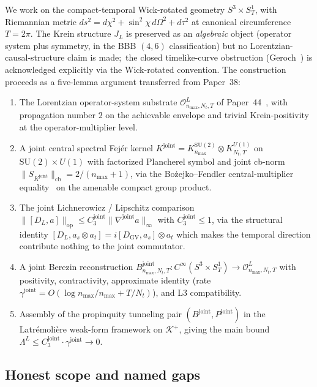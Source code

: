 \documentclass[11pt,a4paper]{article}
\theoremstyle{plain}
\theoremstyle{definition}
\newcommand{\nmax}{n_{\max}}
\newcommand{\Nt}{N_{t}}
\newcommand{\Manifold}{S^{3}\times S^{1}_{T}}
\newcommand{\Krein}{\mathcal{K}}
\newcommand{\Op}{\mathcal{O}}
\newcommand{\opnorm}[1]{\lVert #1 \rVert_{\mathrm{op}}}
\newcommand{\cbnorm}[1]{\lVert #1 \rVert_{\mathrm{cb}}}
\newcommand{\norm}[1]{\lVert #1 \rVert}
\newcommand{\SU}{\mathrm{SU}}
\newcommand{\Uone}{U(1)}
\newcommand{\DGV}{D_{\mathrm{GV}}}
\newcommand{\DL}{D_{L}}
\newcommand{\JL}{J_{L}}
\newcommand{\Lprop}{\Lambda^{L}}
\newcommand{\Bjoint}{B^{\mathrm{joint}}}
\newcommand{\Pjoint}{P^{\mathrm{joint}}}
\newcommand{\Kjoint}{K^{\mathrm{joint}}}
\newcommand{\KSU}{K^{\SU(2)}}
\newcommand{\KU}{K^{\Uone}}
\newcommand{\gammajoint}{\gamma^{\mathrm{joint}}}
\newcommand{\Cthreejoint}{C_{3}^{\mathrm{joint}}}
\newcommand{\Kplus}{\Krein^{+}}
\begin{document}
We work on the compact-temporal Wick-rotated geometry $\Manifold$,
with Riemannian metric $ds^{2} = d\chi^{2} + \sin^{2}\chi\,d\Omega^{2}
+ d\tau^{2}$ at canonical circumference $T = 2\pi$. The Krein structure
$\JL$ is preserved as an \emph{algebraic} object (operator system plus
symmetry, in the BBB $(4, 6)$ classification) but no
Lorentzian-causal-structure claim is made;\ the closed timelike-curve
obstruction (Geroch~\cite{geroch1967}) is acknowledged explicitly via
the Wick-rotated convention. The construction proceeds as a five-lemma
argument transferred from Paper~38:
\begin{enumerate}
\item[(L1$'$)] The Lorentzian operator-system substrate
$\Op^{L}_{\nmax,\Nt,T}$ of Paper~44~\cite{paper44}, with propagation
number $2$ on the achievable envelope and trivial Krein-positivity at
the operator-multiplier level.
\item[(L2)] A joint central spectral Fej\'er kernel
$\Kjoint = \KSU_{\nmax} \otimes \KU_{\Nt,T}$ on $\SU(2) \times \Uone$
with factorized Plancherel symbol and joint cb-norm
$\cbnorm{S_{\Kjoint}} = 2/(\nmax+1)$, via the Bo\.zejko--Fendler
central-multiplier equality~\cite{bozejko_fendler1991,pisier2001}
on the amenable compact group product.
\item[(L3)] The joint Lichnerowicz / Lipschitz comparison
$\opnorm{[\DL, a]} \le \Cthreejoint \norm{\nabla^{\mathrm{joint}} a}_{\infty}$
with $\Cthreejoint \le 1$, via the structural identity
$[\DL, a_{s} \otimes a_{t}] = i[\DGV, a_{s}] \otimes a_{t}$ which
makes the temporal direction contribute nothing to the joint
commutator.
\item[(L4)] A joint Berezin reconstruction
$\Bjoint_{\nmax,\Nt,T} : C^{\infty}(\Manifold) \to \Op^{L}_{\nmax,\Nt,T}$
with positivity, contractivity, approximate identity (rate
$\gammajoint = O(\log\nmax/\nmax + T/\Nt)$), and L3 compatibility.
\item[(L5)] Assembly of the propinquity tunneling pair
$(\Bjoint, \Pjoint)$ in the Latr\'emoli\`ere weak-form framework on
$\Kplus$, giving the main bound
$\Lprop \le \Cthreejoint \cdot \gammajoint \to 0$.
\end{enumerate}

\subsection{Honest scope and named gaps}\label{sec:scope_intro}
\end{document}
